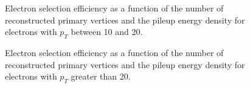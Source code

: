 \begin{figure}[!htbp]
\begin{center}
\caption{Electron selection efficiency as a function of the number of reconstructed primary vertices
and the pileup energy density for electrons with $p_{T}$ between 10 and 20\GeV.}
\label{fig:ele_selectionEfficiency_LowPt_VsPileup}
\end{center}
\end{figure}



\begin{figure}[!htbp]
\begin{center}
\caption{Electron selection efficiency as a function of the number of reconstructed primary vertices
and the pileup energy density for electrons with $p_{T}$ greater than 20\GeV.}
\label{fig:ele_selectionEfficiency_HighPt_VsPileup}
\end{center}
\end{figure}



